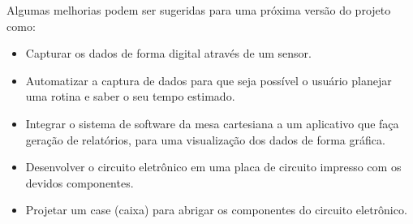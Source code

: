 Algumas melhorias podem ser sugeridas para uma próxima versão do projeto como:

\begin{itemize}
    \item Capturar os dados de forma digital através de um sensor.
    \item Automatizar a captura de dados para que seja possível o usuário planejar uma rotina e saber o seu tempo estimado.
    \item Integrar o sistema de software da mesa cartesiana a um aplicativo que faça geração de relatórios, para uma visualização dos dados de forma gráfica.
    \item Desenvolver o circuito eletrônico em uma placa de circuito impresso com os devidos componentes.
    \item Projetar um case (caixa) para abrigar os componentes do circuito eletrônico.
\end{itemize}
